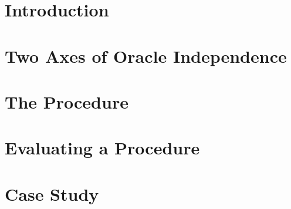 \documentclass[sigconf,nonacm]{acmart}
\begin{document}
\maketitle

\section{Introduction}


\section{Two Axes of Oracle Independence}


\section{The Procedure}


\section{Evaluating a Procedure}


\section{Case Study}

\end{document}
